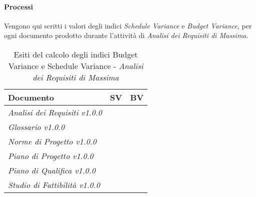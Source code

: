 	\paragraph{Processi} \Spazio
	Vengono qui scritti i valori degli indici \textit{Schedule Variance} e \textit{Budget Variance}, per ogni documento prodotto durante l'attività di \textit{Analisi dei Requisiti di Massima.} 
	
	\begin{table}
		\begin{tabular}{|C{7cm}|C{2cm}|C{2cm}|}
			\hline
			\textbf{Documento} & \textbf{SV} & \textbf{BV}  \\
			\hline
			\textit{Analisi dei Requisiti v1.0.0} & &  \\
			\hline
			\textit{Glossario v1.0.0} & &  \\
			\hline
			\textit{Norme di Progetto v1.0.0} & & \\
			\hline
			\textit{Piano di Progetto v1.0.0} & & \\
			\hline
			\textit{Piano di Qualifica v1.0.0} & & \\
			\hline
			\textit{Studio di Fattibilità v1.0.0} & & \\
			\hline
			
		\end{tabular}
		\caption{Esiti del calcolo degli indici Budget Variance e Schedule Variance - \textit{Analisi dei Requisiti di Massima}}
	\end{table}